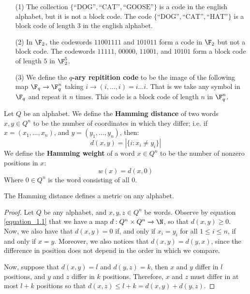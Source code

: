 \begin{example}\label{example_1.2}
  \begin{enumerate}
    \item[(1)] The collection $\{\text{``DOG''}, \text{``CAT''},
      \text{``GOOSE''}\}$ is a code in the english alphabet, but it is not a
      block code. The code $\{\text{``DOG''}, \text{``CAT''},
      \text{``HAT''}\}$ is a block code of length $3$ in the english alphabet.

      \item[(2)] In $\F_2$, the codewords  $11001111$ and  $101011$ form a code
        in  $\F_2$ but not a block code. The codewords $11111$, $00000$,
        $11001$, and  $10101$ form a block code of length  $5$ in  $\F_2^5$.

      \item[(3)] We define the \textbf{$q$-ary repitition code} to be the image
        of the following map $\F_q \xrightarrow{} \F_q^n$ taking $i
        \xrightarrow{} (i, \dots, i)=i \dots i$. That is we take any symbol in
        $\F_q$ and repeat it $n$ times. This code is a block code of length $n$
        in $\F_q^n$.
  \end{enumerate}
\end{example}

\begin{definition}
  Let $Q$ be an alphabet. We define the  \textbf{Hamming distance} of two words
  $x,y \in Q^n$ to be the number of coordinates in which they differ; i.e. if
  $x=(x_1, \dots, x_n)$, and $y=(y_1, \dots, y_n)$, then:
  \begin{equation}\label{equation_1.1}
    d(x,y)=|\{i : x_i \neq y_i\}|
  \end{equation}
  We define the \textbf{Hamming weight} of a word $x \in Q^n$ to be the number
  of nonzero positions in $x$:
  \begin{equation}\label{equation_1.3}
    w(x)=d(x,0)
  \end{equation}
  Where $0 \in Q^n$ is the word consisting of all $0$.
\end{definition}

\begin{lemma}\label{lemma_1.1.1}
  The Hamming distance defines a metric on any alphabet.
\end{lemma}
\begin{proof}
  Let $Q$ be any alphabet, and  $x,y,z \in Q^n$ be words. Observe by equation
  \ref{equation_1.1} that we have a map $d:Q^n \times Q^n \xrightarrow{} \N$, so
  that $d(x,y) \geq 0$. Now, we also have that $d(x,y)=0$ if, and only if
  $x_i=y_i$ for all  $1 \leq i \leq n$, if and only if $x=y$. Moreover, we also
  notices that  $d(x,y)=d(y,x)$, since the difference in position does not
  depend in the order in which we compare.

  Now, suppose that $d(x,y)=l$ and $d(y,z)=k$, then $x$ and  $y$ differ in  $l$
  positions, and  $y$ and $z$ differ in $k$ positions. Therefore, $x$ and $z$
  must differ in at most  $l+k$ positions so that  $d(x,z) \leq
  l+k=d(x,y)+d(y,z)$.
\end{proof}

